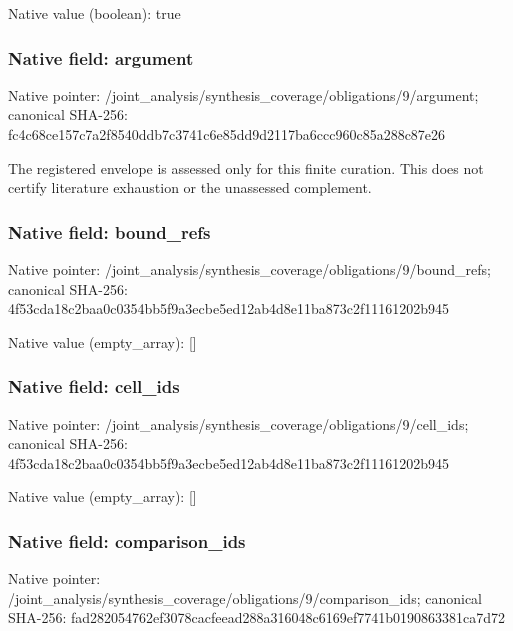 \documentclass[10pt,a4paper]{article}
\begin{document}
Native value (boolean): true



\subsubsection{Native field: argument}


Native pointer: /joint\_analysis/synthesi\allowbreak{}s\_coverage/obligations/9\allowbreak{}/argument; canonical SHA-256: fc4c68ce157c7a2f8540ddb7\allowbreak{}c3741c6e85dd9d2117ba6ccc\allowbreak{}960c85a288c87e26


The registered envelope is assessed only for this finite curation. This does not certify literature exhaustion or the unassessed complement.


\subsubsection{Native field: bound\_refs}


Native pointer: /joint\_analysis/synthesi\allowbreak{}s\_coverage/obligations/9\allowbreak{}/bound\_refs; canonical SHA-256: 4f53cda18c2baa0c0354bb5f\allowbreak{}9a3ecbe5ed12ab4d8e11ba87\allowbreak{}3c2f11161202b945



Native value (empty\_array): []



\subsubsection{Native field: cell\_ids}


Native pointer: /joint\_analysis/synthesi\allowbreak{}s\_coverage/obligations/9\allowbreak{}/cell\_ids; canonical SHA-256: 4f53cda18c2baa0c0354bb5f\allowbreak{}9a3ecbe5ed12ab4d8e11ba87\allowbreak{}3c2f11161202b945



Native value (empty\_array): []



\subsubsection{Native field: comparison\_ids}


Native pointer: /joint\_analysis/synthesi\allowbreak{}s\_coverage/obligations/9\allowbreak{}/comparison\_ids; canonical SHA-256: fad282054762ef3078cacfee\allowbreak{}ad288a316048c6169ef7741b\allowbreak{}0190863381ca7d72
\end{document}

